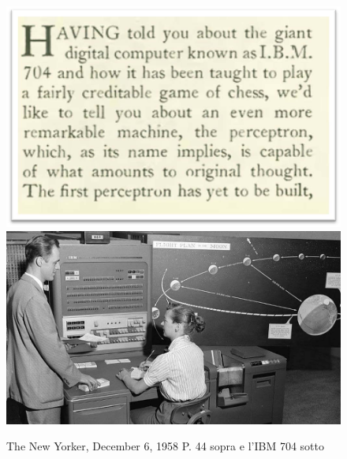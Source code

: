 \begin{frame}
\begin{columns}
\begin{figure}[!htbp]
				\includegraphics[width=1.0\linewidth]{images/supervised/perceptron/The_New_Yorker_December_6_1958_P44.jpg}
				\includegraphics[width=0.8\linewidth]{images/supervised/perceptron/The_IBM_704_computer.jpg}
				\caption{The New Yorker, December 6, 1958 P. 44 sopra e l'IBM 704 sotto}
			\end{figure}
			
		\end{columns}
		

\end{frame}


